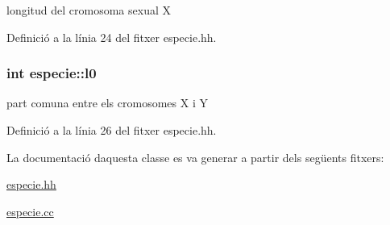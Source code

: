 longitud del cromosoma sexual X 



Definició a la línia 24 del fitxer especie.\+hh.

\subsubsection[{\texorpdfstring{l0}{l0}}]{\setlength{\rightskip}{0pt plus 5cm}int especie\+::l0\hspace{0.3cm}{\ttfamily [private]}}\hypertarget{classespecie_a7e4448f0f61a573753aa7000ad073982}{}\label{classespecie_a7e4448f0f61a573753aa7000ad073982}


part comuna entre els cromosomes X i Y 



Definició a la línia 26 del fitxer especie.\+hh.



La documentació d\textquotesingle{}aquesta classe es va generar a partir dels següents fitxers\+:\begin{DoxyCompactItemize}
\item 
\hyperlink{especie_8hh}{especie.\+hh}\item 
\hyperlink{especie_8cc}{especie.\+cc}\end{DoxyCompactItemize}
